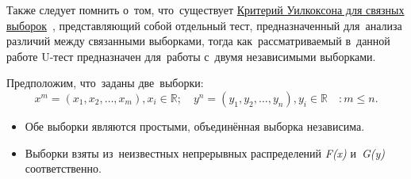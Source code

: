 \documentclass[]{scrreprt}
\begin{document}
Также следует помнить о~том, что~существует \href{http://www.machinelearning.ru/wiki/index.php?title=Критерий_Уилкоксона_для_связных_выборок}{Критерий Уилкоксона для связных выборок}~\cite{Wilcoxon-signed-rank-test}, представляющий собой отдельный тест, предназначенный для~анализа различий между связанными выборками, тогда как~рассматриваемый в~данной работе U-тест предназначен для~работы с~двумя независимыми выборками.

Предположим, что~заданы две~выборки:
\begin{equation*}
	x^{m} = (x_{1},x_{2},\ldots,x_{m}), x_{i} \in \mathbb{R};\quad y^{n} = (y_{1},y_{2},\ldots,y_{n}), y_{i} \in \mathbb{R} \quad: m \leq n.
\end{equation*}
 
\begin{itemize}
	\item Обе выборки являются простыми, объединённая выборка независима.
	\item Выборки взяты из~неизвестных непрерывных распределений \textit{F(x)} и~\textit{G(y)} соответственно.
\end{itemize}
 
\end{document}
